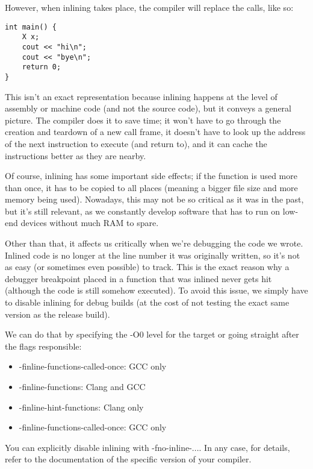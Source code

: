 However, when inlining takes place, the compiler will replace the calls, like so:

\begin{lstlisting}[style=styleCXX]
int main() {
	X x;
	cout << "hi\n";
	cout << "bye\n";
	return 0;
}
\end{lstlisting} 

This isn't an exact representation because inlining happens at the level of assembly or machine code (and not the source code), but it conveys a general picture.
The compiler does it to save time; it won't have to go through the creation and teardown of a new call frame, it doesn't have to look up the address of the next instruction to execute (and return to), and it can cache the instructions better as they are nearby.

Of course, inlining has some important side effects; if the function is used more than once, it has to be copied to all places (meaning a bigger file size and more memory being used). Nowadays, this may not be so critical as it was in the past, but it's still relevant, as we constantly develop software that has to run on low-end devices without much RAM to spare.

Other than that, it affects us critically when we're debugging the code we wrote. Inlined code is no longer at the line number it was originally written, so it's not as easy (or sometimes even possible) to track. This is the exact reason why a debugger breakpoint placed in a function that was inlined never gets hit (although the code is still somehow executed). To avoid this issue, we simply have to disable inlining for debug builds (at the cost of not testing the exact same version as the release build).

We can do that by specifying the -O0 level for the target or going straight after the flags responsible:

\begin{itemize}
\item 
-finline-functions-called-once: GCC only

\item 
-finline-functions: Clang and GCC

\item 
-finline-hint-functions: Clang only

\item 
-finline-functions-called-once: GCC only
\end{itemize}

You can explicitly disable inlining with -fno-inline-.... In any case, for details, refer to the documentation of the specific version of your compiler.

